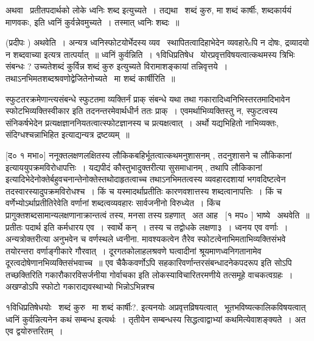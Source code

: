 \documentclass[11pt, openany]{book}
\begin{document}
 अथवा \textendash\ प्रतीतपदार्थको लोके ध्वनिः शब्द इत्युच्यते~। तद्यथा \textendash\ शब्दं कुरु,
मा शब्दं कार्षीः, शब्दकार्ययं माणवकः, इति ध्वनिं कुर्वन्नेवमुच्यते~। 
तस्मात् ध्वनिः शब्दः~॥ 

 (प्रदीपः ) अथवेति~। अन्यत्र ध्वनिस्फोटयोर्भेदस्य व्यव \textendash\ 
स्थापितत्वादिहाभेदेन व्यवहारेsपि न दोषः, द्रव्यादयो न शब्दवाच्या इत्यत्र
तात्पर्यात्~॥ ध्वनिं कुर्वन्निति~। १विधिप्रतिषेध \textendash\ 
योरप्रवृत्तविषयत्वात्कथमस्य त्रिभिः संबन्धः ? उच्यतेशब्दं कुर्विन्न
{\qt शब्दं कुरु} इत्युच्यते विरामाशङ्कायां तन्निवृत्तये~। 
तथाऽनभिमतशब्दश्रवणोद्वेजितेनोच्यते \textendash\ मा शब्दं कार्षीरिति~॥ 



स्फुटतरक्रमेणान्त्यसंबन्धे स्फुटतमा व्यक्तिर्नं प्राक् संबन्धे यथा तथा
गकारादिध्वनिभिस्तरतमादिभावेन स्फोटभिव्यक्तिस्वीकार इति
तदनन्तरमेवार्थधीर्न ततः प्राक्~। एवमर्थाभिव्यक्तिस्तु न, स्फुटत्वस्य
संनिकर्षभेदेन प्रत्यक्षज्ञाननियतत्वात्स्फोटज्ञानस्य च प्रत्यक्षत्वात्~। 
अर्थो यद्यभिहितो नाभिव्यक्तः, संदिग्धश्चन्नाभिहित इत्याद्यन्यत्र
द्रष्टव्यम्~॥ 

 [द० १ मभा०] ननूक्तलक्षणलक्षितस्य लौकिकबहिर्भूतत्वात्कथमनुशासनम् ,
तदनुशासने च {\qt लौकिकानां} इत्याययुपक्रमविरोधापत्तिः~। यद्यपीदं
कौस्तुभादुक्तरीत्या सुसमाधानम् , तथापि {\qt लौकिकानां}
इत्यादिभेदेनोक्तेर्बहुवचनान्तेनोक्तेस्तथोदाहृतत्वाच्च
तथाऽनभिमतत्वस्य व्यवहारदशायां भगवदिष्टत्वेन
तदस्वारस्यादुपक्रमविरोधश्च~। किं च यस्मादर्थाप्रतीतिः कारणवशात्तस्य
शब्दत्वानापत्तिः~। किं च वर्णेभ्योऽर्थाप्रतीतिरेवेति वर्णानां
शब्दत्वव्यवहारः सार्वजनीनो विरुध्येत~। किंच
प्रागुक्तशब्दसामान्यलक्षणानाक्रान्तत्वं तस्य, मनसा तस्य ग्रहणात् \textendash\ अत
आह \textendash\ [१ मप० ] भाष्ये \textendash\ अथवेति~॥ प्रतीतः पदार्थ इति कर्मधारय एव~। 
स्वार्थे कन्~। तस्य च तद्वोधके लक्षणा३~। ध्वनय एव वर्णाः~। 
अन्यत्रोक्तरीत्या अनुभवेन च वर्णस्थले ध्वनीना. मावश्यकत्वेन तैरेव
स्फोटत्वेनाभिमताभिव्यक्तिसंभवे तयोरन्तरा वर्णाङ्गीकारे गौरवात्~। 
दूरगतकोलाहलश्रवणे घत्वादीनां श्रूयमाणध्वनिगतानामेव
दूरत्वदोषेणानभिव्यक्तिसंभवाच्च~॥ एव चैकैकवर्णोऽपि
सहकारिवर्णान्तरसंबन्धादनेकपदरूप इति सोऽपि तच्छक्तिरिति
गकारौकारविसर्जनीया गोर्वाचका इति लोकस्याविचारितरमणीये तत्समूहे
वाचकत्वग्रहः~। अखण्डोऽपि स्फोटो गकाराद्यवस्थाभ्यो
भिन्नोऽभिन्नश्च 



 १विधिप्रतिषेधयोः \textendash\ {\qt शब्दं कुरु} \textendash\ मा शब्दं कार्षीः?. इत्यनयोः
अप्रवृत्तव्रिषयत्वात् \textendash\ भूतभविष्यत्कालिकविषयत्वात् ध्वनिं
कुर्वन्नित्यनेन कथं सम्बन्ध इत्यर्थः~। तृतीयेन सम्बन्धस्य
सिद्धत्वाद्वाभ्यां कथमित्येवाशङ्क्यते~। अत एव द्वयोरुत्तरितम्~। 
\end{document}
